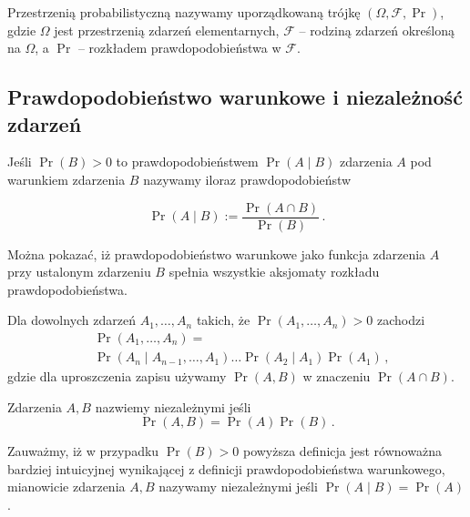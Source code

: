 \documentclass{myclass}
\numberwithin{equation}{subsection}
\begin{document}
\begin{definition}
Przestrzenią probabilistyczną nazywamy uporządkowaną trójkę \((\Omega, \mathcal{F}, \Pr)\), gdzie
\(\Omega\) jest przestrzenią zdarzeń elementarnych, \(\mathcal{F}\) -- rodziną zdarzeń określoną na
\(\Omega\), a \(\Pr\) -- rozkładem prawdopodobieństwa w \(\mathcal{F}\).
\end{definition}


\subsection{Prawdopodobieństwo warunkowe i niezależność zdarzeń}

\begin{definition}
Jeśli \(\Pr(B) > 0\) to prawdopodobieństwem \(\Pr(A \mid B)\) zdarzenia \(A\) pod warunkiem
zdarzenia \(B\) nazywamy iloraz prawdopodobieństw

\begin{equation*}
    \Pr(A \mid B) := \frac{\Pr(A \cap B)}{ \Pr(B)}\,.
\end{equation*}
\end{definition}

Można pokazać, iż prawdopodobieństwo warunkowe jako funkcja zdarzenia \(A\) przy ustalonym zdarzeniu
\(B\) spełnia wszystkie aksjomaty rozkładu prawdopodobieństwa.

\begin{theorem}
Dla dowolnych zdarzeń \(A_1,\ldots,A_n\) takich, że \(\Pr(A_1,\ldots,A_n) > 0\) zachodzi
\begin{equation*}
    \begin{split}
        &\Pr(A_1,\ldots,A_n) =\\
        &\Pr(A_n \mid A_{n-1},\ldots,A_1) \ldots \Pr(A_2 \mid A_1) \Pr(A_1)\,,
    \end{split}
\end{equation*}
gdzie dla uproszczenia zapisu używamy \(\Pr(A,B)\) w znaczeniu \(\Pr(A \cap B)\).
\end{theorem}

\begin{definition}
Zdarzenia \(A, B\) nazwiemy niezależnymi jeśli
\begin{equation*}
    \Pr(A, B) = \Pr(A) \Pr(B)\,.
\end{equation*}
\end{definition}

Zauważmy, iż w przypadku \(\Pr(B) > 0\) powyższa definicja jest równoważna bardziej intuicyjnej
wynikającej z definicji prawdopodobieństwa warunkowego, mianowicie zdarzenia \(A,B\) nazywamy
niezależnymi jeśli \(\Pr(A \mid B) = \Pr(A)\).
\end{document}
